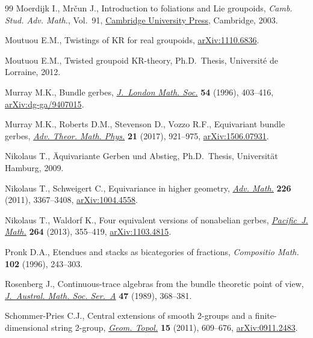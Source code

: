 \begin{thebibliography}{99}
Moerdijk I., Mr\v{c}un J., Introduction to foliations and {L}ie groupoids,
 \textit{Camb. Stud. Adv. Math.}, Vol.~91,
 \href{https://doi.org/10.1017/CBO9780511615450}{Cambridge University Press},
 Cambridge, 2003.

Moutuou E.M., Twistings of {KR} for real groupoids,
 \href{http://arxiv.org/abs/1110.6836}{arXiv:1110.6836}.

Moutuou E.M., Twisted groupoid {KR}-theory, Ph.D.~Thesis, {U}niversit\'e de
 Lorraine, 2012.

Murray M.K., Bundle gerbes,
 \href{https://doi.org/10.1093/acprof:oso/9780199534920.003.0012}{\textit{J.~London
 Math. Soc.}} \textbf{54} (1996), 403--416,
 \href{http://arxiv.org/abs/dg-ga/9407015}{arXiv:dg-ga/9407015}.

Murray M.K., Roberts D.M., Stevenson D., Vozzo R.F., Equivariant bundle gerbes,
 \href{https://doi.org/10.4310/ATMP.2017.v21.n4.a3}{\textit{Adv. Theor. Math.
 Phys.}} \textbf{21} (2017), 921--975,
 \href{http://arxiv.org/abs/1506.07931}{arXiv:1506.07931}.

Nikolaus T., \"Aquivariante {G}erben und {A}bstieg, Ph.D.~Thesis,
 {U}niversit\"at Hamburg, 2009.

Nikolaus T., Schweigert C., Equivariance in higher geometry,
 \href{https://doi.org/10.1016/j.aim.2010.10.016}{\textit{Adv. Math.}}
 \textbf{226} (2011), 3367--3408,
 \href{http://arxiv.org/abs/1004.4558}{arXiv:1004.4558}.

Nikolaus T., Waldorf K., Four equivalent versions of nonabelian gerbes,
 \href{https://doi.org/10.2140/pjm.2013.264.355}{\textit{Pacific~J. Math.}}
 \textbf{264} (2013), 355--419,
 \href{http://arxiv.org/abs/1103.4815}{arXiv:1103.4815}.

Pronk D.A., Etendues and stacks as bicategories of fractions,
 \textit{Compositio Math.} \textbf{102} (1996), 243--303.

Rosenberg J., Continuous-trace algebras from the bundle theoretic point of
 view, \href{https://doi.org/10.1017/S1446788700033097}{\textit{J.~Austral.
 Math. Soc. Ser.~A}} \textbf{47} (1989), 368--381.

Schommer-Pries C.J., Central extensions of smooth 2-groups and a
 finite-dimensional string 2-group,
 \href{https://doi.org/10.2140/gt.2011.15.609}{\textit{Geom. Topol.}}
 \textbf{15} (2011), 609--676,
 \href{http://arxiv.org/abs/0911.2483}{arXiv:0911.2483}.


\end{thebibliography}
